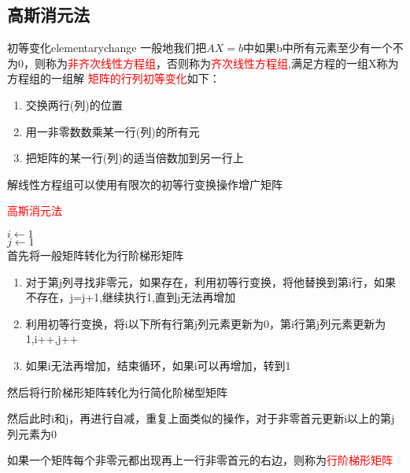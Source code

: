 \subsection{高斯消元法}


\begin{definition}{初等变化}{elementarychange}
    一般地我们把$AX=b$中如果b中所有元素至少有一个不为0，则称为\textcolor{red}{非齐次线性方程组}，否则称为\textcolor{red}{齐次线性方程组},满足方程的一组X称为方程组的一组解
\textcolor{red}{矩阵的行列初等变化}如下：

\begin{enumerate}
    \item 交换两行(列)的位置
    \item 用一非零数数乘某一行(列)的所有元
    \item 把矩阵的某一行(列)的适当倍数加到另一行上
\end{enumerate}
\end{definition}


\begin{note}
    解线性方程组可以使用有限次的初等行变换操作增广矩阵
\end{note}

\begin{algorithm}[H]
    \caption[]{\textcolor{red}{高斯消元法}}
    $i\leftarrow 1$\\
    $j\leftarrow 1$\\
    首先将一般矩阵转化为行阶梯形矩阵
    \begin{enumerate}
        \item 对于第j列寻找非零元，如果存在，利用初等行变换，将他替换到第i行，如果不存在，j=j+1,继续执行1,直到j无法再增加
        \item 利用初等行变换，将i以下所有行第j列元素更新为0，第i行第j列元素更新为1,i++,j++
        \item 如果i无法再增加，结束循环，如果i可以再增加，转到1
    \end{enumerate}

    然后将行阶梯形矩阵转化为行简化阶梯型矩阵

    然后此时i和j，再进行自减，重复上面类似的操作，对于非零首元更新i以上的第j列元素为0
\end{algorithm}

如果一个矩阵每个非零元都出现再上一行非零首元的右边，则称为\textcolor{red}{行阶梯形矩阵}

